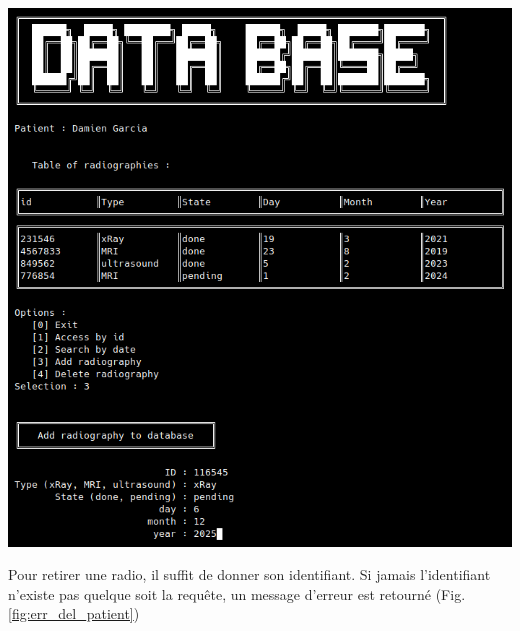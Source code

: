 \documentclass[12pt,a4paper]{article}
\newenvironment{Figure}
{\par\medskip\noindent\minipage{\linewidth}}
{\endminipage\par\medskip}
\begin{document}
\begin{multicols}{2}
		\begin{Figure}
			\centering
			\includegraphics[width=\linewidth]{images/walkthrough/doctor_patient_add.png}
			\label{fig:add_patient}
		\end{Figure}
		
		Pour retirer une radio, il suffit de donner son identifiant. Si jamais l'identifiant n'existe pas quelque soit la requête, un message d'erreur est retourné (Fig. \ref{fig:err_del_patient}) \\
		

\end{multicols}
\end{document}
